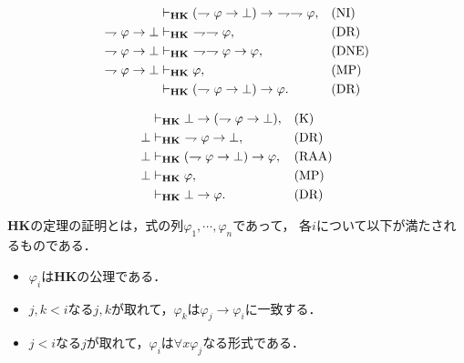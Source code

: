 	\begin{sketch}[RAA]
		\begin{align}
			&\provable{\mbox{{\bf HK}}} (\rightharpoondown \varphi \rightarrow \bot) \rightarrow\ 
				\rightharpoondown \rightharpoondown \varphi, && \mbox{(NI)} \\
			\rightharpoondown \varphi \rightarrow \bot &\provable{\mbox{{\bf HK}}}\ 
				\rightharpoondown \rightharpoondown \varphi, && \mbox{(DR)} \\
			\rightharpoondown \varphi \rightarrow \bot &\provable{\mbox{{\bf HK}}}\ 
				\rightharpoondown \rightharpoondown \varphi \rightarrow \varphi, && \mbox{(DNE)} \\
			\rightharpoondown \varphi \rightarrow \bot &\provable{\mbox{{\bf HK}}} \varphi, && \mbox{(MP)} \\
			&\provable{\mbox{{\bf HK}}} (\rightharpoondown \varphi \rightarrow \bot) \rightarrow \varphi. && \mbox{(DR)}
		\end{align}
		\QED
	\end{sketch}
	
	\begin{sketch}[EFQ]
		\begin{align}
			&\vdash_{{\scriptsize \mbox{{\bf HK}}}} \bot \rightarrow (\rightharpoondown \varphi \rightarrow \bot), && \mbox{(K)} \\
			\bot &\vdash_{{\scriptsize \mbox{{\bf HK}}}}\ \rightharpoondown \varphi \rightarrow \bot, && \mbox{(DR)} \\
			\bot &\vdash_{{\scriptsize \mbox{{\bf HK}}}} (\rightharpoondown \varphi \rightarrow \bot) \rightarrow \varphi,
				&& \mbox{(RAA)} \\
			\bot &\vdash_{{\scriptsize \mbox{{\bf HK}}}} \varphi, && \mbox{(MP)} \\
			&\vdash_{{\scriptsize \mbox{{\bf HK}}}} \bot \rightarrow \varphi. && \mbox{(DR)}
		\end{align}
		\QED
	\end{sketch}
	
	{\bf HK}の定理の証明とは，式の列$\varphi_{1},\cdots,\varphi_{n}$であって，
	各$i$について以下が満たされるものである．
	\begin{itemize}
		\item $\varphi_{i}$は{\bf HK}の公理である．
		\item $j,k < i$なる$j,k$が取れて，$\varphi_{k}$は$\varphi_{j} \rightarrow \varphi_{i}$に一致する．
		\item $j < i$なる$j$が取れて，$\varphi_{i}$は$\forall x \varphi_{j}$なる形式である．
	\end{itemize}
	
